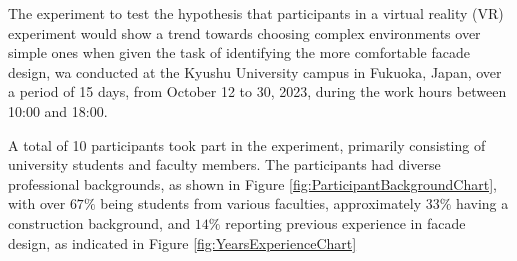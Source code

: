 
The experiment to test the hypothesis that participants in a virtual reality (VR) experiment would show a trend towards choosing complex environments over simple ones when given the task of identifying the more comfortable facade design, wa conducted at the Kyushu University campus in Fukuoka, Japan, over a period of 15 days, from October 12 to 30, 2023, during the work hours between 10:00 and 18:00.

A total of 10 participants took part in the experiment, primarily consisting of university students and faculty members.
The participants had diverse professional backgrounds, as shown in Figure \ref{fig:ParticipantBackgroundChart}, with over \(67\%\) being students from various faculties, approximately \(33\%\) having a construction background, and \(14\%\) reporting previous experience in facade design, as indicated in Figure \ref{fig:YearsExperienceChart}

